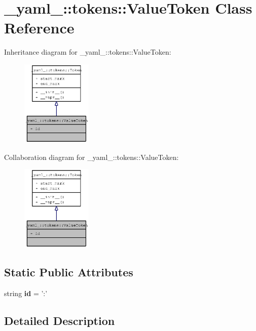 \section{\_\-yaml\_\-::tokens::ValueToken Class Reference}
\label{class__yaml___1_1tokens_1_1ValueToken}
Inheritance diagram for \_\-yaml\_\-::tokens::ValueToken:\nopagebreak
\begin{figure}[H]
\begin{center}
\leavevmode
\includegraphics[width=95pt]{class__yaml___1_1tokens_1_1ValueToken__inherit__graph}
\end{center}
\end{figure}
Collaboration diagram for \_\-yaml\_\-::tokens::ValueToken:\nopagebreak
\begin{figure}[H]
\begin{center}
\leavevmode
\includegraphics[width=95pt]{class__yaml___1_1tokens_1_1ValueToken__coll__graph}
\end{center}
\end{figure}
\subsection*{Static Public Attributes}
\begin{CompactItemize}
\item 
string {\bf id} = ':'
\end{CompactItemize}


\subsection{Detailed Description}


